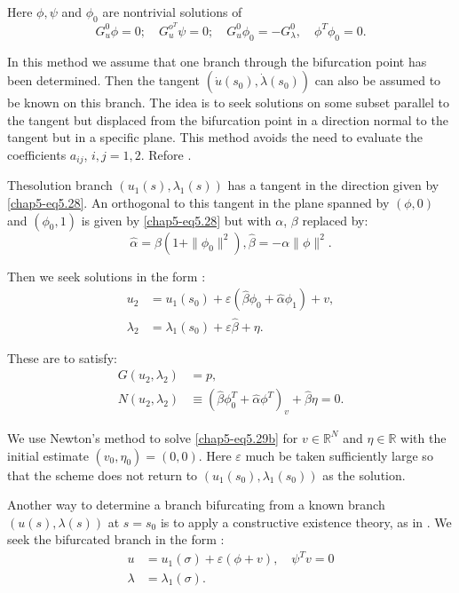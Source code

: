  Here $\phi, \psi$ and $\phi_{0}$ are nontrivial solutions of  
 $$
 G^{0}_{u} \phi = 0; \quad G^{o^{T}}_{u}\psi = 0; \quad G^{0}_{u}\phi_{0} = -
 G^{0}_{\lambda}, \quad \phi^{T} \phi_{0} = 0. 
 $$

\medskip
{}
In this method we assume that one branch through the bifurcation point
has been determined. Then the tangent $(\dot{u}(s_{0}), \dot{\lambda}
(s_{0}))$ can also be assumed to be known on this branch. The idea is
to seek solutions on some subset parallel to the tangent but displaced
from the bifurcation point in a direction normal to the tangent but
in a specific plane. This method avoids the need to evaluate the
coefficients $a_{ij}$, $i,j = 1,2$. Refore \cite{key19}.

The\pageoriginale solution branch $(u_{1}(s), \lambda_{1}(s))$ has a
tangent in the 
direction given by \eqref{chap5-eq5.28}. An orthogonal to this tangent in the
plane spanned by $(\phi, 0)$ and $(\phi_{0}, 1)$ is given by
\eqref{chap5-eq5.28} but with $\alpha$, $\beta$ replaced by: 
$$
\hat{\alpha} = \beta (1 + \| \phi_{0} \|^{2}), \hat{\beta} = -
\alpha\| \phi\|^{2}.  
$$

Then we seek solutions in the form :
\begin{equation*}
\begin{split}
u_{2} & = u_{1}(s_{0}) + \varepsilon(\hat{\beta}\phi_{0} +
\hat{\alpha}\phi_{1}) + v, \\
\lambda_{2} & = \lambda_{1}(s_{0}) + \varepsilon \hat{\beta} + \eta. 
\end{split}\tag{5.29a}\label{chap5-eq5.29a}
\end{equation*}

These are to satisfy:
\begin{equation*}
\begin{split}
G(u_{2}, \lambda_{2}) & = p,\\
N(u_{2}, \lambda_{2}) & \equiv (\hat{\beta}\phi^{T}_{0} + \hat{\alpha}
\phi^{T})_{v} + \hat{\beta}\eta = 0.  
\end{split}\tag{5.29b}\label{chap5-eq5.29b}
\end{equation*}

We use Newton's method to solve \eqref{chap5-eq5.29b} for $v \in
\mathbb{R}^{N}$ and $\eta \in \mathbb{R}$ with the initial estimate
$(v_{0}, \eta_{0}) = (0,0)$. Here $\varepsilon$ much be taken
sufficiently large so that the scheme does not return to
$(u_{1}(s_{0}), \lambda_{1}(s_{0}))$ as the solution.  


\medskip
{}
Another way to determine a branch bifurcating from a known branch
$(u(s), \lambda (s))$ at $s = s_{0}$ is to apply a constructive
existence theory, as in \cite{key22}. We seek the bifurcated branch in the
form :   
\begin{equation*}
\begin{split}
u & = u_{1} (\sigma) + \varepsilon(\phi + v),\quad \psi^{T}v =
0\\
\lambda & = \lambda_{1}(\sigma). 
\end{split}\tag{5.30a} \label{chap5-eq5.30a}
\end{equation*}

